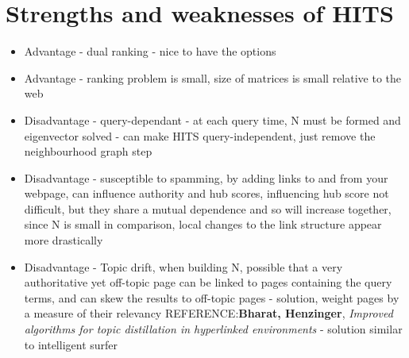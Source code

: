 \documentclass[11pt]{report}
\begin{document}
\section{Strengths and weaknesses of HITS}
\begin{itemize}
\item Advantage - dual ranking - nice to have the options
\item Advantage - ranking problem is small, size of matrices is small relative to the web
\item Disadvantage - query-dependant - at each query time, N must be formed and eigenvector solved - can make HITS query-independent, just remove the neighbourhood graph step
\item Disadvantage - susceptible to spamming, by adding links to and from your webpage, can influence authority and hub scores, influencing hub score not difficult, but they share a mutual dependence and so will increase together, since N is small in comparison, local changes to the link structure appear more drastically
\item Disadvantage - Topic drift, when building N, possible that a very authoritative yet off-topic page can be linked to pages containing the query terms, and can skew the results to off-topic pages - solution, weight pages by a measure of their relevancy REFERENCE:\textbf{Bharat, Henzinger}, \textit{Improved algorithms for topic distillation in hyperlinked environments}  - solution similar to intelligent surfer
\end{itemize}
\end{document}
